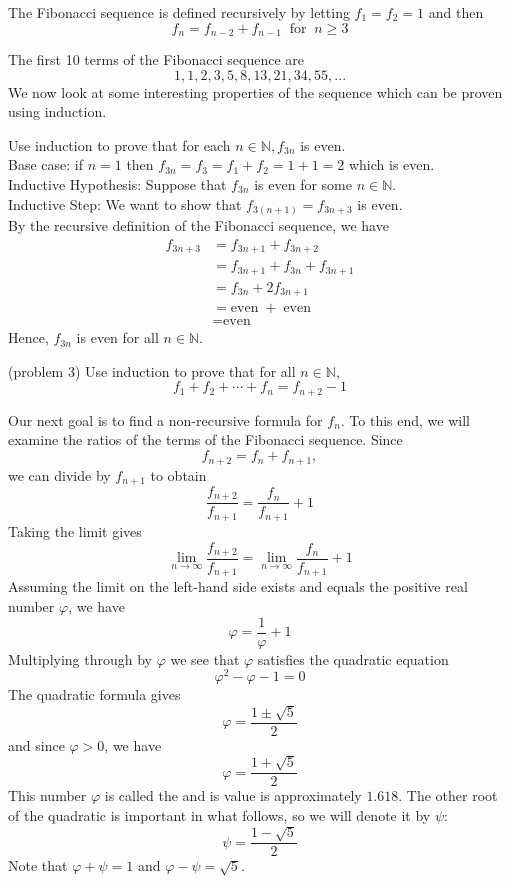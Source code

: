 \documentclass[handout]{ximera}
\begin{document}
\begin{definition}
The Fibonacci sequence is defined recursively by letting $f_1 = f_2 = 1$ and then
\[
f_n = f_{n-2} + f_{n-1}\;\; \text{for}\;\; n \geq 3
\]
\end{definition}

The first 10 terms of the Fibonacci sequence are
\[
1, 1, 2, 3, 5, 8, 13, 21, 34, 55,...
\]
We now look at some interesting properties of the sequence which can be proven using induction.

\begin{example}[example 3]
Use induction to prove that for each $n \in \mathbb{N}, f_{3n}$ is even.\\
Base case: if $n=1$ then $f_{3n} = f_3 = f_1 + f_2 = 1+1 = 2$ which is even.\\
Inductive Hypothesis: Suppose that $f_{3n}$ is even for some $n \in \mathbb{N}$.\\
Inductive Step: We want to show that $f_{3(n+1)} = f_{3n+3}$ is even.\\
By the recursive definition of the Fibonacci sequence, we have 
\begin{align*}
f_{3n+3} &= f_{3n+1} + f_{3n+2}\\
        &= f_{3n+1} + f_{3n} + f_{3n+1}\\
        &= f_{3n} + 2f_{3n+1}\\
        &= \text{even} \; + \; \text{even}\\
        &= \text{even}
\end{align*}
Hence, $f_{3n}$ is even for all $n \in \mathbb{N}$.
\end{example} 

\begin{problem}(problem 3)
Use induction to prove that for all  $n \in \mathbb{N}$,
\[
f_1 + f_2 + \cdots + f_n = f_{n+2} - 1
\]
\end{problem}

Our next goal is to find a non-recursive formula for $f_n$. To this end, 
we will examine the ratios of the terms of the Fibonacci sequence. Since
\[
f_{n+2} = f_n + f_{n+1},
\]
we can divide by $f_{n+1}$ to obtain
\[
\frac{f_{n+2}}{f_{n+1}} = \frac{f_{n}}{f_{n+1}} + 1
\]
Taking the limit gives
\[
\lim_{n \to \infty} \frac{f_{n+2}}{f_{n+1}} = \lim_{n \to \infty} \frac{f_{n}}{f_{n+1}} + 1
\]
Assuming the limit on the left-hand side exists and equals the positive real number $\varphi$, we have
\[
\varphi = \frac{1}{\varphi} + 1
\]
Multiplying through by $\varphi$ we see that $\varphi$ satisfies the quadratic equation
\[
\varphi^2 -\varphi - 1 =0
\]
The quadratic formula gives 
\[
\varphi = \frac{1 \pm \sqrt 5}{2}
\]
and since $\varphi >0$, we have
\[
\varphi = \frac{1 + \sqrt 5}{2}
\]
This number $\varphi$ is called the  and is value is approximately $1.618$. 
The other root of the quadratic is important in what follows, so we will denote it by $\psi$:
\[
\psi = \frac{1 - \sqrt 5}{2}
\]
Note that $\varphi + \psi = 1$ and $\varphi - \psi = \sqrt 5$.
\end{document}
